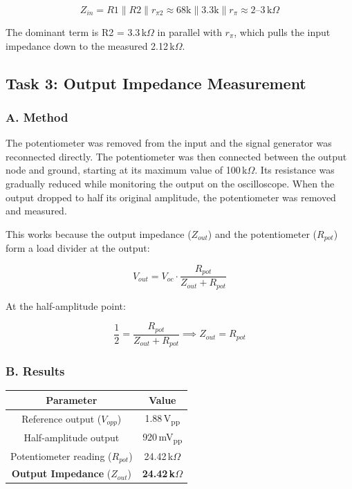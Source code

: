 \documentclass[12pt]{article}
\begin{document}
\begin{equation}
    Z_{in} = R1 \| R2 \| r_{\pi 2} \approx 68\text{k} \| 3.3\text{k} \| r_{\pi}
    \approx 2\text{--}3\,\text{k}\Omega
\end{equation}

\noindent The dominant term is R2 = 3.3\,k$\Omega$ in parallel with $r_{\pi}$, which 
pulls the input impedance down to the measured 2.12\,k$\Omega$.



\subsection*{Task 3: Output Impedance Measurement}

\subsubsection*{A. Method}

The potentiometer was removed from the input and the signal generator was reconnected
directly. The potentiometer was then connected between the output node and ground,
starting at its maximum value of 100\,k$\Omega$. Its resistance was gradually reduced
while monitoring the output on the oscilloscope. When the output dropped to half its
original amplitude, the potentiometer was removed and measured.

This works because the output impedance ($Z_{out}$) and the potentiometer ($R_{pot}$)
form a load divider at the output:

\begin{equation}
    V_{out} = V_{oc} \cdot \frac{R_{pot}}{Z_{out} + R_{pot}}
\end{equation}

\noindent At the half-amplitude point:

\begin{equation}
    \frac{1}{2} = \frac{R_{pot}}{Z_{out} + R_{pot}} \implies Z_{out} = R_{pot}
\end{equation}

\subsubsection*{B. Results}

\begin{center}
\begin{tabular}{cc}
\toprule
\textbf{Parameter} & \textbf{Value} \\
\midrule
Reference output ($V_{opp}$)        & 1.88\,V\textsubscript{pp} \\
Half-amplitude output               & 920\,mV\textsubscript{pp} \\
Potentiometer reading ($R_{pot}$)   & 24.42\,k$\Omega$ \\
\midrule
\textbf{Output Impedance} ($Z_{out}$) & \textbf{24.42\,k$\Omega$} \\
\bottomrule
\end{tabular}
\end{center}
\end{document}
